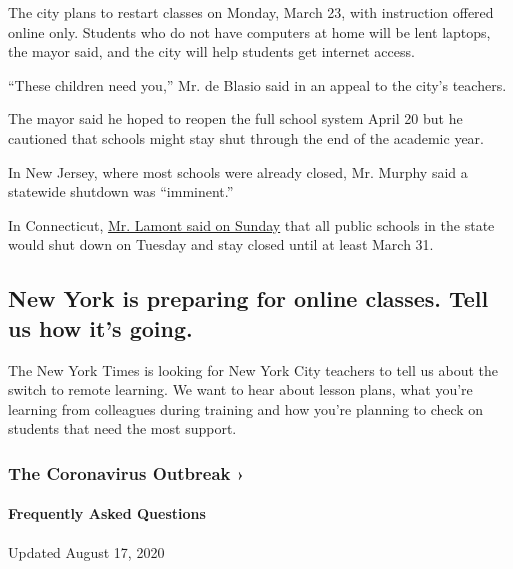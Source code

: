The city plans to restart classes on Monday, March 23, with instruction
offered online only. Students who do not have computers at home will be
lent laptops, the mayor said, and the city will help students get
internet access.

``These children need you,'' Mr. de Blasio said in an appeal to the
city's teachers.

The mayor said he hoped to reopen the full school system April 20 but he
cautioned that schools might stay shut through the end of the academic
year.

In New Jersey, where most schools were already closed, Mr. Murphy said a
statewide shutdown was ``imminent.''

In Connecticut,
\href{https://twitter.com/govnedlamont/status/1239315132435619843?s=21}{Mr.
Lamont said on Sunday} that all public schools in the state would shut
down on Tuesday and stay closed until at least March 31.

\hypertarget{new-york-is-preparing-for-online-classes-tell-us-how-its-going}{%
\subsection{New York is preparing for online classes. Tell us how it's
going.}\label{new-york-is-preparing-for-online-classes-tell-us-how-its-going}}

The New York Times is looking for New York City teachers to tell us
about the switch to remote learning. We want to hear about lesson plans,
what you're learning from colleagues during training and how you're
planning to check on students that need the most support.

\href{https://www.nytimes3xbfgragh.onion/news-event/coronavirus?action=click\&pgtype=Article\&state=default\&region=MAIN_CONTENT_3\&context=storylines_faq}{}

\hypertarget{the-coronavirus-outbreak-}{%
\subsubsection{The Coronavirus Outbreak
›}\label{the-coronavirus-outbreak-}}

\hypertarget{frequently-asked-questions}{%
\paragraph{Frequently Asked
Questions}\label{frequently-asked-questions}}

Updated August 17, 2020

